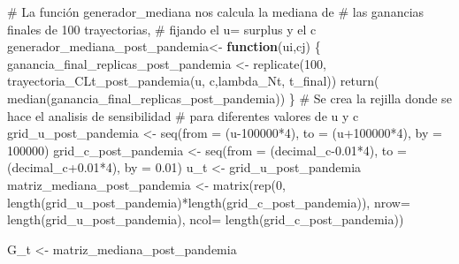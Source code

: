 \documentclass[
  us-letterpaper,
]{scrreprt}
\newenvironment{Shaded}{\begin{snugshade}}{\end{snugshade}}
\newcommand{\AttributeTok}[1]{\textcolor[rgb]{0.40,0.45,0.13}{#1}}
\newcommand{\CommentTok}[1]{\textcolor[rgb]{0.37,0.37,0.37}{#1}}
\newcommand{\ControlFlowTok}[1]{\textcolor[rgb]{0.00,0.23,0.31}{\textbf{#1}}}
\newcommand{\DecValTok}[1]{\textcolor[rgb]{0.68,0.00,0.00}{#1}}
\newcommand{\FloatTok}[1]{\textcolor[rgb]{0.68,0.00,0.00}{#1}}
\newcommand{\FunctionTok}[1]{\textcolor[rgb]{0.28,0.35,0.67}{#1}}
\newcommand{\NormalTok}[1]{\textcolor[rgb]{0.00,0.23,0.31}{#1}}
\newcommand{\OtherTok}[1]{\textcolor[rgb]{0.00,0.23,0.31}{#1}}
\newcommand{\SpecialCharTok}[1]{\textcolor[rgb]{0.37,0.37,0.37}{#1}}
\theoremstyle{definition}
\theoremstyle{plain}
\theoremstyle{plain}
\theoremstyle{remark}
\begin{document}
\begin{Shaded}
\begin{Highlighting}[]
\CommentTok{\# La función generador\_mediana nos calcula la mediana de }
\CommentTok{\# las ganancias finales de 100 trayectorias, }
\CommentTok{\# fijando el u= surplus y el c}
\NormalTok{generador\_mediana\_post\_pandemia}\OtherTok{\textless{}{-}} \ControlFlowTok{function}\NormalTok{(ui,cj)}
\NormalTok{  \{}
\NormalTok{  ganancia\_final\_replicas\_post\_pandemia }\OtherTok{\textless{}{-}} \FunctionTok{replicate}\NormalTok{(}\DecValTok{100}\NormalTok{,}
           \FunctionTok{trayectoria\_CLt\_post\_pandemia}\NormalTok{(u, c,lambda\_Nt, t\_final))}
    \FunctionTok{return}\NormalTok{( }\FunctionTok{median}\NormalTok{(ganancia\_final\_replicas\_post\_pandemia))}
\NormalTok{  \}}
\CommentTok{\# Se crea la rejilla donde se hace el analisis de sensibilidad}
\CommentTok{\# para diferentes valores de u y c}
\NormalTok{grid\_u\_post\_pandemia }\OtherTok{\textless{}{-}} \FunctionTok{seq}\NormalTok{(}\AttributeTok{from =}\NormalTok{ (u}\DecValTok{{-}100000}\SpecialCharTok{*}\DecValTok{4}\NormalTok{), }
                            \AttributeTok{to =}\NormalTok{ (u}\SpecialCharTok{+}\DecValTok{100000}\SpecialCharTok{*}\DecValTok{4}\NormalTok{), }
                            \AttributeTok{by =} \DecValTok{100000}\NormalTok{)}
\NormalTok{grid\_c\_post\_pandemia }\OtherTok{\textless{}{-}} \FunctionTok{seq}\NormalTok{(}\AttributeTok{from =}\NormalTok{ (decimal\_c}\FloatTok{{-}0.01}\SpecialCharTok{*}\DecValTok{4}\NormalTok{), }
                            \AttributeTok{to =}\NormalTok{ (decimal\_c}\FloatTok{+0.01}\SpecialCharTok{*}\DecValTok{4}\NormalTok{), }
                            \AttributeTok{by =} \FloatTok{0.01}\NormalTok{)}
\NormalTok{u\_t }\OtherTok{\textless{}{-}}\NormalTok{ grid\_u\_post\_pandemia}
\NormalTok{matriz\_mediana\_post\_pandemia }\OtherTok{\textless{}{-}} \FunctionTok{matrix}\NormalTok{(}\FunctionTok{rep}\NormalTok{(}\DecValTok{0}\NormalTok{, }
      \FunctionTok{length}\NormalTok{(grid\_u\_post\_pandemia)}\SpecialCharTok{*}\FunctionTok{length}\NormalTok{(grid\_c\_post\_pandemia)),}
      \AttributeTok{nrow=} \FunctionTok{length}\NormalTok{(grid\_u\_post\_pandemia), }
      \AttributeTok{ncol=} \FunctionTok{length}\NormalTok{(grid\_c\_post\_pandemia))}

\NormalTok{G\_t }\OtherTok{\textless{}{-}}\NormalTok{ matriz\_mediana\_post\_pandemia}


\end{Highlighting}
\end{Shaded}
\end{document}
